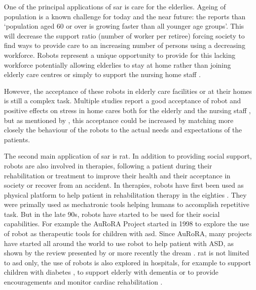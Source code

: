 	One of the principal applications of \gls{sar} is care for the elderlies. Ageing of population is a known challenge for today and the near future: the \cite{united2017world} reports than `population aged 60 or over is growing faster than all younger age groups'. This will decrease the support ratio (number of worker per retiree) forcing society to find ways to provide care to an increasing number of persons using a decreasing workforce. Robots represent a unique opportunity to provide for this lacking workforce potentially allowing elderlies to stay at home rather than joining elderly care centres \citep{di2014web} or simply to support the nursing home staff \citep{wada2004effects}.
	
	
    However, the acceptance of these robots in elderly care facilities or at their homes is still a complex task. Multiple studies report a good acceptance of robot and positive effects on stress in home cares both for the elderly and the nursing staff \citep{wada2004effects}, but as mentioned by \citet{broadbent2009acceptance}, this acceptance could be increased by matching more closely the behaviour of the robots to the actual needs and expectations of the patients.	
		
	The second main application of \gls{sar} is \gls{rat}. In addition to providing social support, robots are also involved in therapies, following a patient during their rehabilitation or treatment to improve their health and their acceptance in society or recover from an accident. In therapies, robots have first been used as physical platform to help patient in rehabilitation therapy in the eighties \citep{harwin1988robot}. They were primally used as mechatronic tools helping humans to accomplish repetitive task. But in the late 90s, robots have started to be used for their social capabilities. For example the AuRoRA Project \citep{dautenhahn1999robots} started in 1998 to explore the use of robot as therapeutic tools for children with \gls{asd}. Since AuRoRA, many projects have started all around the world to use robot to help patient with ASD, as shown by the review presented by \cite{diehl2012clinical} or more recently the \gls{dream} \citep{esteban2017build}. \gls{rat} is not limited to \gls{asd} only, the use of robots is also explored in hospitals, for example to support children with diabetes \citep{belpaeme2012multimodal}, to support elderly with dementia \citep{wada2005psychological} or to provide encouragements and monitor cardiac rehabilitation \citep{lara2017human}.	
	
